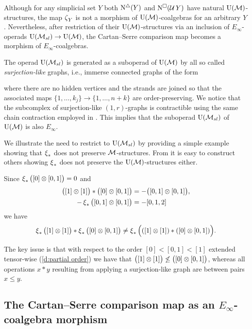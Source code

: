 Although for any simplicial set $Y$ both $\operatorname{N^{\triangle}}(Y)$ and $\operatorname{N^{\square}}(\operatorname{\mathcal{U}} Y)$ have natural ${\operatorname{U}(\mathcal{M})}$-structures, the map $\operatorname{\zeta}_Y$ is not a morphism of ${\operatorname{U}(\mathcal{M})}$-coalgebras for an arbitrary $Y$.
Nevertheless, after restriction of their ${\operatorname{U}(\mathcal{M})}$-structures via an inclusion of $E_\infty$-operads ${\operatorname{U}(\mathcal{M}_{sl})} \to {\operatorname{U}(\mathcal{M})}$, the Cartan--Serre comparison map becomes a morphism of $E_\infty$-coalgebras.

The operad ${\operatorname{U}(\mathcal{M}_{sl})}$ is generated as a suboperad of ${\operatorname{U}(\mathcal{M})}$ by all so called \textit{surjection-like} graphs, i.e., immerse connected graphs of the form

where there are no hidden vertices and the strands are joined so that the associated maps $\{1, \dots, k_j\} \to \{1, \dots, n+k\}$ are order-preserving.
We notice that the subcomplex of surjection-like $(1,r)$-graphs is contractible using the same chain contraction employed in \cite{medina2020prop1}.
This implies that the suboperad ${\operatorname{U}(\mathcal{M}_{sl})}$ of ${\operatorname{U}(\mathcal{M})}$ is also $E_\infty$.

\begin{example}
	We illustrate the need to restrict to ${\operatorname{U}(\mathcal{M}_{sl})}$ by providing a simple example showing that $\operatorname{\xi}_\ast$ does not preserve $\mathcal{M}$-structures.
	From it is easy to construct others showing $\operatorname{\xi}_\ast$ does not preserve the ${\operatorname{U}(\mathcal{M})}$-structures either.

	Since $\operatorname{\xi}_\ast \big( [0] \otimes [0,1] \big) = 0$ and
	\begin{align*}
	\big( [1] \otimes [1] \big) \ast \big( [0] \otimes [0,1] \big) &=
	- \big( [0,1] \otimes [0,1] \big), \\
	- \operatorname{\xi}_\ast \big( [0,1] \otimes [0,1] \big) & = - [0,1,2]
	\end{align*}
	we have
	\[
	\operatorname{\xi}_\ast \big( [1] \otimes [1] \big) \ast \operatorname{\xi}_\ast \big( [0] \otimes [0,1] \big) \neq \operatorname{\xi}_\ast \Big( ([1] \otimes [1]) \ast ([0] \otimes [0,1]) \Big).
	\]

	The key issue is that with respect to the order $[0] < [0,1] < [1]$ extended tensor-wise (\cref{d:partial order}) we have that $\big( [1] \otimes [1] \big) \not\leq \big( [0] \otimes [0,1] \big)$, whereas all operations $x \ast y$ resulting from applying a surjection-like graph are between pairs $x \leq y$.
\end{example}

\subsection{The Cartan--Serre comparison map as an $E_\infty$-coalgebra morphism}

